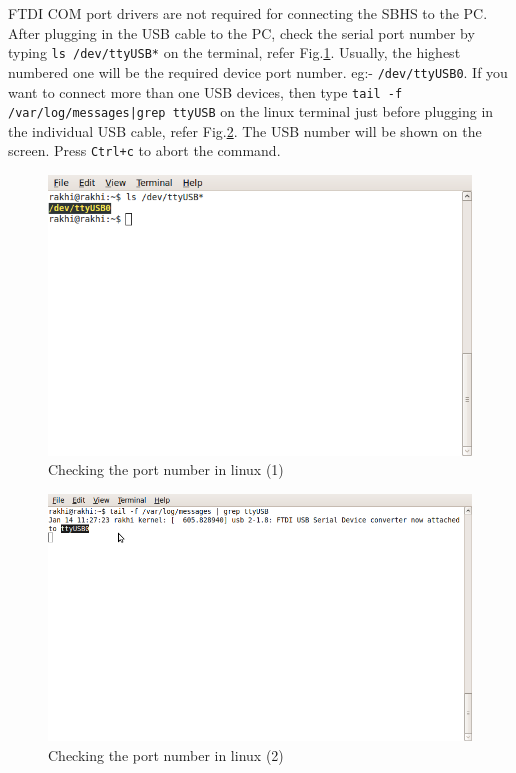 FTDI COM port drivers are not required for connecting the SBHS to the PC. After plugging in the USB cable to the PC, check the serial port number by typing {\tt ls /dev/ttyUSB*} on the terminal, refer Fig.\ref{lstty}. Usually, the highest numbered one will be the required device port number. eg:- {\tt /dev/ttyUSB0}. If you want to connect more than one USB devices, then type {\tt tail -f /var/log/messages|grep ttyUSB} on the linux terminal just before plugging in the individual USB cable, refer Fig.\ref{tailusb}. The USB number will be shown on the screen. Press {\tt Ctrl+c} to abort the command. 
\begin{figure}
\centering
\includegraphics[width=0.7\linewidth]{using-sbhs/lstty.png}
\caption{Checking the port number in linux (1)}
\label{lstty}
\end{figure}
\begin{figure}
\centering
\includegraphics[width=0.7\linewidth]{using-sbhs/tailusb.png}
\caption{Checking the port number in linux (2)}
\label{tailusb}
\end{figure}

